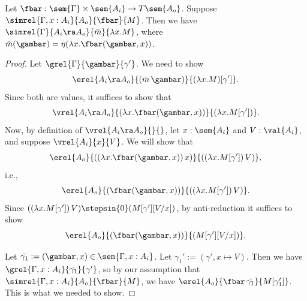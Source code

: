 \begin{lemma}
    Let $\fbar : \sem{\Gamma} \times \sem{A_i} \to T\sem{A_o}$.
    Suppose $\simrel{\Gamma, x : A_i}{A_o}{\fbar}{M}$.
    Then we have $\simrel{\Gamma}{A_i \ra A_o}{\bar{m}}{\lambda x.M}$, where
    $\bar{m}(\gambar) = \eta(\lambda x. \fbar(\gambar, x))$.
\end{lemma}
\begin{proof}

    Let $\grel{\Gamma}{\gambar}{\gamma'}$. We need to show
    \[ \erel{A_i \ra A_o} {(\bar{m}\, \gambar)} {(\lambda x.M)[\gamma']}. \]
    Since both are values, it suffices to show that
    \[ \vrel {A_i \ra A_o} {(\lambda x. \fbar(\gambar, x))} {(\lambda x.M[\gamma'])}. \]
    Now, by definition of $\vrel{A_i \ra A_o}{}{}$, let $x : \sem{A_i}$ and $V : \val{A_i}$,
    and suppose $\vrel{A_i}{x}{V}$. We will show that
    \[ \erel{A_o} {((\lambda x. \fbar(\gambar, x))\, x)} {((\lambda x.M[\gamma'])\, V)}, \]
    i.e.,
    \[ \erel{A_o} {(\fbar(\gambar, x))} {((\lambda x.M[\gamma'])\, V)}. \]
    Since $((\lambda x.M[\gamma'])\, V) \stepsin{0} (M[\gamma'][V/x])$,
    by anti-reduction it suffices to show
    \[ \erel{A_o} {(\fbar(\gambar, x))} {(M[\gamma'][V/x])}. \]

    Let $\bar{\gamma_1} := (\gambar, x) \in \sem{\Gamma, x : A_i}$.
    Let $\gamma_1' := (\gamma', x \mapsto V)$.
    Then we have $\grel{\Gamma, x : A_i}{\bar{\gamma_1}}{\gamma'}$,
    so by our assumption that $\simrel{\Gamma, x : A_i}{A_o}{\fbar}{M}$,
    we have $\erel{A_o} {\fbar\, \bar{\gamma_1}} {M[\gamma_1']}$.
    This is what we needed to show.

\end{proof}

